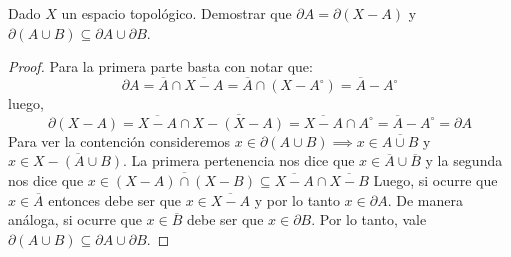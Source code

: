 \documentclass{article}
\theoremstyle{definition}
\newcommand{\cl}[1]{\overline{#1}}              %
\newcommand{\Int}[1]{{#1}^\circ}                %
\newenvironment{ejercicio}[1]{\begin{trivlist}
\item[\hskip \labelsep {\bfseries Ejercicio}\hskip \labelsep {\bfseries #1.}]}{\end{trivlist}}
\begin{document}
\begin{ejercicio}{6}
    Dado \(X\) un espacio topológico. Demostrar que \(\partial A=\partial(X-A)\) y \(\partial(A\cup B)\subseteq\partial A\cup\partial B\).
\end{ejercicio}
\begin{proof}
    Para la primera parte basta con notar que: \[
        \partial A = \cl{A} \cap \overline{X - A} = \cl{A} \cap (X - \Int{A}) = \cl{A} - \Int{A}
    \]
    luego, \[
        \partial(X - A) = \overline{X - A} \cap \overline{X - (X - A)} = \overline{X - A} \cap \Int{A} = \cl{A} - \Int{A} = \partial A
    \]
    Para ver la contención consideremos \( x \in \partial (A \cup B) \implies x \in \overline{A \cup B} \) y \( x \in \overline{X - (A \cup B)}\). La primera pertenencia nos dice que \( x \in \cl{A} \cup \overline{B} \) y la segunda nos dice que \( x \in \overline{(X-A) \cap (X-B)} \subseteq \overline{X-A} \cap \overline{X-B} \)
    Luego, si ocurre que \( x \in \cl{A} \) entonces debe ser que \( x \in \overline{X-A} \) y por lo tanto \( x \in \partial A \). De manera análoga, si ocurre que \( x \in \overline{B} \) debe ser que \( x \in \partial B \). Por lo tanto, vale \( \partial (A \cup B) \subseteq \partial A \cup \partial B \).
\end{proof}

\clearpage
\end{document}
